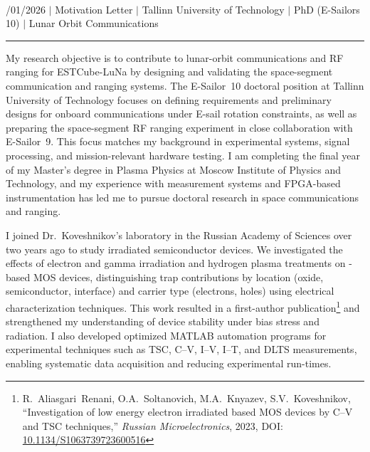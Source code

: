 \documentclass[a4paper,12pt]{article}
\begin{document}
{\centering
  {\scshape {}} \\ 
  {\fontsize{10}{10}/01/2026} $|$
  {\fontsize{10}{10}\selectfont Motivation Letter} $|$
  {\fontsize{10}{10}\selectfont Tallinn University of Technology} $|$
  {\fontsize{10}{10}\selectfont PhD (E-Sailors 10)} $|$
  {\fontsize{10}{10}\selectfont Lunar Orbit Communications}
\par}
\vspace{-15pt}
\noindent\rule{\textwidth}{0.5pt}

\vspace{-5pt}

My research objective is to contribute to lunar-orbit communications and RF ranging for ESTCube-LuNa by designing and validating the space-segment communication and ranging systems. The E-Sailor~10 doctoral position at Tallinn University of Technology focuses on defining requirements and preliminary designs for onboard communications under E-sail rotation constraints, as well as preparing the space-segment RF ranging experiment in close collaboration with E-Sailor~9. This focus matches my background in experimental systems, signal processing, and mission-relevant hardware testing. I am completing the final year of my Master's degree in Plasma Physics at Moscow Institute of Physics and Technology, and my experience with measurement systems and FPGA-based instrumentation has led me to pursue doctoral research in space communications and ranging.

I joined Dr.\ Koveshnikov's laboratory in the Russian Academy of Sciences over two years ago to study irradiated semiconductor devices. We investigated the effects of electron and gamma irradiation and hydrogen plasma treatments on -based MOS devices, distinguishing trap contributions by location (oxide, semiconductor, interface) and carrier type (electrons, holes) using electrical characterization techniques. This work resulted in a first-author publication\footnote{R.~Aliasgari~Renani, O.A.~Soltanovich, M.A.~Knyazev, S.V.~Koveshnikov, ``Investigation of low energy electron irradiated  based MOS devices by C--V and TSC techniques,'' \textit{Russian Microelectronics}, 2023, DOI: \href{https://doi.org/10.1134/S1063739723600516}{10.1134/S1063739723600516}} and strengthened my understanding of device stability under bias stress and radiation. I also developed optimized MATLAB automation programs for experimental techniques such as TSC, C--V, I--V, I--T, and DLTS measurements, enabling systematic data acquisition and reducing experimental run-times.
\end{document}
